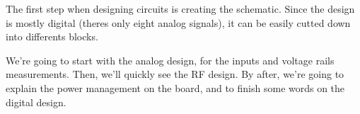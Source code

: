 The first step when designing circuits is creating the schematic.
Since the design is mostly digital (theres only eight analog signals), it
can be easily cutted down into differents blocks.

We're going to start with the analog design, for the inputs and voltage
rails measurements. Then, we'll quickly see the RF design. By after, we're
going to explain the power management on the board, and to finish some words
on the digital design.